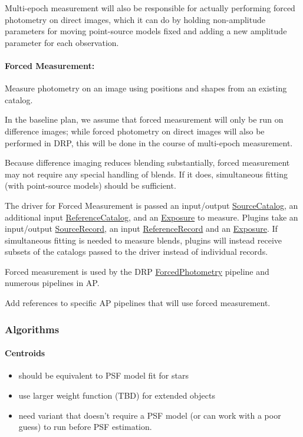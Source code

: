 Multi-epoch measurement will also be responsible for actually performing forced photometry on direct images, which it can do by holding non-amplitude parameters for moving point-source models fixed and adding a new amplitude parameter for each observation.

\paragraph{Forced Measurement:} Measure photometry on an image using positions and shapes from an existing catalog.
\label{sec:acForcedMeasurement}

In the baseline plan, we assume that forced measurement will only be run on difference images; while forced photometry on direct images will also be performed in DRP, this will be done in the course of multi-epoch measurement.

Because difference imaging reduces blending substantially, forced measurement may not require any special handling of blends.  If it does, simultaneous fitting (with point-source models) should be sufficient.

The driver for Forced Measurement is passed an input/output \hyperref[sec:spTablesSource]{SourceCatalog}, an additional input \hyperref[sec:spTablesReference]{ReferenceCatalog}, and an \hyperref[sec:spImagesExposure]{Exposure} to measure.  Plugins take an input/output \hyperref[sec:spTablesSource]{SourceRecord}, an input \hyperref[sec:spTablesReference]{ReferenceRecord} and an \hyperref[sec:spImagesExposure]{Exposure}.  If simultaneous fitting is needed to measure blends, plugins will instead receive subsets of the catalogs passed to the driver instead of individual records.

Forced measurement is used by the DRP \hyperref[sec:drpForcedPhotometry]{ForcedPhotometry} pipeline and numerous pipelines in AP.

\begin{note}[TODO]
Add references to specific AP pipelines that will use forced measurement.
\end{note}

\subsubsection{Algorithms}

\paragraph{Centroids}
\label{sec:acCentroidAlgorithms}
\begin{itemize}
\item should be equivalent to PSF model fit for stars
\item use larger weight function (TBD) for extended objects
\item need variant that doesn't require a PSF model (or can work with a poor guess) to run before PSF estimation.
\end{itemize}

